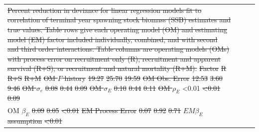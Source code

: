 \documentclass[
  12pt,
]{article}
\makeatletter
\providecommand{\DIFdel}[1]{{\protect\color{red}\sout{#1}}} %
\providecommand{\DIFdelFL}[1]{\DIFdel{#1}} %
\providecommand{\DIFdelbeginFL}{} %
\providecommand{\DIFdelendFL}{} %
\providecommand{\DIFscaledelfig}{0.5}
\newlength{\DIFdelgraphicswidth} %
\newlength{\DIFdelgraphicsheight} %
\providecommand{\DIFdelincludegraphics}[2][]{%
\sbox{\DIFdelgraphicsbox}{\DIFOincludegraphics[#1]{#2}}%
\settoboxwidth{\DIFdelgraphicswidth}{\DIFdelgraphicsbox} %
\settoboxtotalheight{\DIFdelgraphicsheight}{\DIFdelgraphicsbox} %
\scalebox{\DIFscaledelfig}{%
\parbox[b]{\DIFdelgraphicswidth}{\usebox{\DIFdelgraphicsbox}\\[-\baselineskip] \rule{\DIFdelgraphicswidth}{0em}}\llap{\resizebox{\DIFdelgraphicswidth}{\DIFdelgraphicsheight}{%
\setlength{\unitlength}{\DIFdelgraphicswidth}%
\begin{picture}(1,1)%
\thicklines\linethickness{2pt} %
{\color[rgb]{1,0,0}\put(0,0){\framebox(1,1){}}}%
{\color[rgb]{1,0,0}\put(0,0){\line( 1,1){1}}}%
{\color[rgb]{1,0,0}\put(0,1){\line(1,-1){1}}}%
\end{picture}%
}\hspace*{3pt}}} %
} %
\DeclareRobustCommand{\DIFdelbeginFL}{\DIFOdelbeginFL \let\includegraphics\DIFdelincludegraphics} %
\DeclareRobustCommand{\DIFdelendFL}{\DIFOaddendFL \let\includegraphics\DIFOincludegraphics} %
\let\sout@orig\sout %
\renewcommand{\sout}[1]{\ifmmode\text{\sout@orig{\ensuremath{#1}}}\else\sout@orig{#1}\fi} %
\makeatother
\begin{document}
\begin{table}
{\begin{center}
\begin{tabular}{lrrr}
{%
\DIFdelFL{Percent reduction in deviance for linear regression models fit to correlation of terminal year spawning stock biomass (SSB) estimates and true values. Table rows give each operating model (OM) and estimating model (EM) factor included individually, combined, and with second and third order interactions. Table columns are operating models (OMs) with process error on recruitment only (R), recruitment and apparent survival (R+S), or recruitment and natural mortality (R+M).}}%
{%
\DIFdelFL{Factor}}%
{%
\DIFdelFL{R}}%
{%
\DIFdelFL{R+S}}%
{%
\DIFdelFL{R+M}}%
\DIFdelFL{OM $F$ history}%
\DIFdelFL{19.27}%
\DIFdelFL{25.70}%
\DIFdelFL{19.59}%
\DIFdelFL{OM Obs. Error}%
\DIFdelFL{12.53}%
\DIFdelFL{3.60}%
\DIFdelFL{9.46}%
\DIFdelFL{OM $\sigma_e$}%
\DIFdelFL{0.08}%
\DIFdelFL{0.44}%
\DIFdelFL{0.09}%
\DIFdelFL{OM $\sigma_E$}%
\DIFdelFL{0.10}%
\DIFdelFL{0.44}%
\DIFdelFL{0.11}%
\DIFdelFL{OM $\rho_{E}$}%
\DIFdelendFL \textless  0.01\DIFdelbeginFL %
\DIFdelFL{\textless  0.01}%
\DIFdelFL{0.09}\DIFdelendFL \tabularnewline
OM \DIFdelbeginFL \DIFdelFL{$\beta_{E}$}%
\DIFdelFL{0.09}%
\DIFdelFL{0.05}%
\DIFdelFL{\textless  0.01}%
\DIFdelFL{EM Process Error}%
\DIFdelFL{0.07}%
\DIFdelFL{0.92}%
\DIFdelFL{0.71}%
\DIFdelFL{$EM \beta_{E}$ assumption}%
\DIFdelFL{\textless  0.01}%

\end{tabular}
\end{center}}
\end{table}
\end{document}
